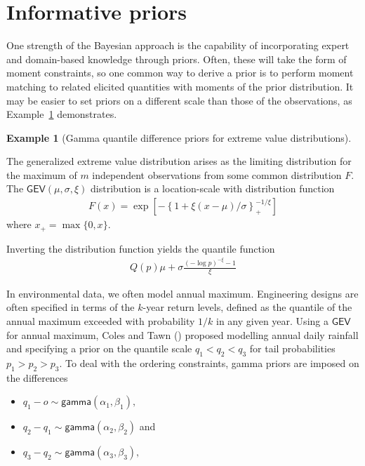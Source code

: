 \documentclass[
  11pt,
  letterpaper,
]{scrbook}
\providecommand{\tightlist}{%
  \setlength{\itemsep}{0pt}\setlength{\parskip}{0pt}}
\theoremstyle{definition}
\newtheorem{example}{Example}[chapter]
\theoremstyle{plain}
\theoremstyle{plain}
\theoremstyle{plain}
\theoremstyle{definition}
\theoremstyle{definition}
\theoremstyle{plain}
\theoremstyle{plain}
\theoremstyle{remark}
\begin{document}
\section{Informative priors}\label{informative-priors}

One strength of the Bayesian approach is the capability of incorporating
expert and domain-based knowledge through priors. Often, these will take
the form of moment constraints, so one common way to derive a prior is
to perform moment matching to related elicited quantities with moments
of the prior distribution. It may be easier to set priors on a different
scale than those of the observations, as Example~\ref{exm-colestawn}
demonstrates.

\begin{example}[Gamma quantile difference priors for extreme value
distributions]\protect\hypertarget{exm-colestawn}{}\label{exm-colestawn}

The generalized extreme value distribution arises as the limiting
distribution for the maximum of \(m\) independent observations from some
common distribution \(F.\) The \(\mathsf{GEV}(\mu, \sigma, \xi)\)
distribution is a location-scale with distribution function
\begin{align*}
F(x) = \exp\left[ - \left\{1+\xi(x-\mu)/\sigma\right\}^{-1/\xi}_{+}\right]
\end{align*} where \(x_{+} = \max\{0, x\}.\)

Inverting the distribution function yields the quantile function
\begin{align*}
Q(p) \mu + \sigma \frac{(-\log p)^{-\xi}-1}{\xi}
\end{align*}

In environmental data, we often model annual maximum. Engineering
designs are often specified in terms of the \(k\)-year return levels,
defined as the quantile of the annual maximum exceeded with probability
\(1/k\) in any given year. Using a \(\mathsf{GEV}\) for annual maximum,
Coles and Tawn () proposed modelling
annual daily rainfall and specifying a prior on the quantile scale
\(q_1 < q_2 < q_3\) for tail probabilities \(p_1> p_2 > p_3.\) To deal
with the ordering constraints, gamma priors are imposed on the
differences

\begin{itemize}
\tightlist
\item
  \(q_1 - o \sim \mathsf{gamma}(\alpha_1, \beta_1),\)
\item
  \(q_2 - q_1 \sim \mathsf{gamma}(\alpha_2, \beta_2)\) and
\item
  \(q_3-q_2 \sim \mathsf{gamma}(\alpha_3, \beta_3),\)
\end{itemize}


\end{example}
\end{document}
